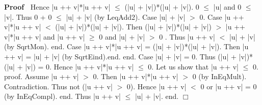 \documentclass{article}
\newenvironment{forthel}{\begin{leftbar}}{\end{leftbar}}
\newenvironment{proof}{\noindent\textbf{Proof\ }}{\hspace*{\fill}$\Box$\medskip}
\begin{document}
\begin{forthel}
\begin{proof}
Hence |u ++ v|*|u ++ v| $\leq$ (|u| + |v|)*(|u| + |v|).
0 $\leq$ |u| and 0 $\leq$ |v|. Thus 0 + 0 $\leq$ |u| + |v| (by LeqAdd2).
Case |u| + |v| $>$ 0. 
Case |u ++ v|*|u ++ v| $<$ (|u| + |v|)*(|u| + |v|). 
Then (|u| + |v|)*(|u| + |v|) $>$ |u ++ v|*|u ++ v| and |u ++ v| $\geq$ 0 and |u| + |v| $>$ 0 .
Thus |u ++ v| $<$ |u| + |v| (by SqrtMon). end.
Case |u ++ v|*|u ++ v| = (|u| + |v|)*(|u| + |v|). Then |u ++ v| = |u| + |v| (by SqrtEind).end.
end.
Case |u| + |v| = 0. Thus (|u| + |v|)*(|u| + |v|) = 0. Hence |u ++ v|*|u ++ v| $\leq$ 0. 
Let us show that |u ++ v| $\leq$ 0. 
proof. 	Assume |u ++ v| $>$ 0. Then |u ++ v|*|u ++ v| $>$ 0 (by InEqMult). Contradiction.
Thus not (|u ++ v| $>$ 0). Hence |u ++ v| $<$ 0 or |u ++ v| = 0 (by InEqCompl).
end.
Thus |u ++ v| $\leq$ |u| + |v|.
end.
\end{proof}

\end{forthel}
\end{document}
